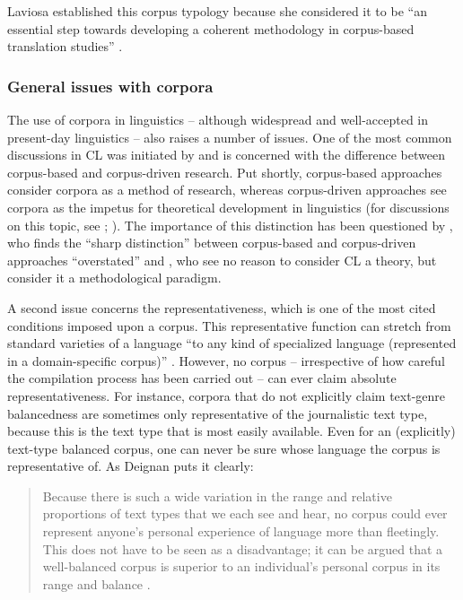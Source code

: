 Laviosa established this corpus typology because she considered it to be “an essential step towards developing a coherent methodology in corpus-based translation studies” \citep[38]{laviosa_corpus-based_2002}.

\subsubsection{General issues with corpora}
\label{sec:2.2.1.4}  
The use of corpora in linguistics – although widespread and well-accepted in present-day linguistics – also raises a number of issues. One of the most common discussions in CL was initiated by \citet{tognini-bonelli_corpus_2001} and is concerned with the difference between corpus-based and corpus-driven research. Put shortly, corpus-based approaches consider corpora as a method of research, whereas corpus-driven approaches see corpora as the impetus for theoretical development in linguistics (for discussions on this topic, see \citealt[384--385]{hardie_two_2010}; \citealt[150 ff.]{mcenery_corpus_2012}). The importance of this distinction has been questioned by \citet[994]{ludeling_theory-driven_2009}, who finds the “sharp distinction” between corpus-based and corpus-driven approaches “overstated” and \citet[328]{gries_behavioral_2010}, who see no reason to consider CL a theory, but consider it a methodological paradigm.

A second issue concerns the representativeness, which is one of the most cited conditions imposed upon a corpus. This representative function can stretch from standard varieties of a language “to any kind of specialized language (represented in a domain-specific corpus)” \citep[11]{aijmer_state_1991}. However, no corpus – irrespective of how careful the compilation process has been carried out – can ever claim absolute representativeness. For instance, corpora that do not explicitly claim text-genre balancedness are sometimes only representative of the journalistic text type, because this is the text type that is most easily available. Even for an (explicitly) text-type balanced corpus, one can never be sure whose language the corpus is representative of. As Deignan puts it clearly:

\begin{quote}
Because there is such a wide variation in the range and relative proportions of text types that we each see and hear, no corpus could ever represent anyone’s personal experience of language more than fleetingly. This does not have to be seen as a disadvantage; it can be argued that a well-balanced corpus is superior to an individual’s personal corpus in its range and balance \citep[91]{deignan_metaphor_2005}.
\end{quote}

